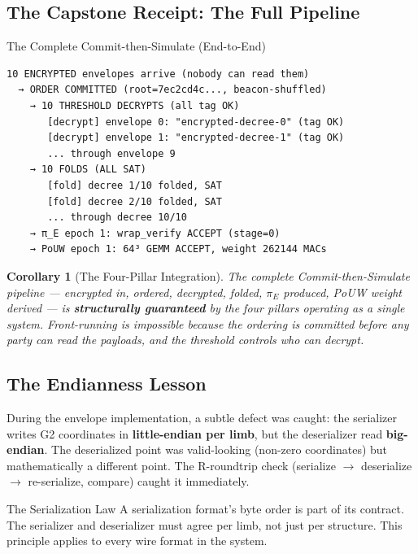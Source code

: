 \documentclass[11pt, a4paper]{article}
\theoremstyle{plain}
\newtheorem{corollary}[theorem]{Corollary}
\theoremstyle{definition}
\theoremstyle{remark}
\begin{document}
\subsection{The Capstone Receipt: The Full Pipeline}

\begin{resultbox}{The Complete Commit-then-Simulate (End-to-End)}
\begin{verbatim}
10 ENCRYPTED envelopes arrive (nobody can read them)
  → ORDER COMMITTED (root=7ec2cd4c..., beacon-shuffled)
    → 10 THRESHOLD DECRYPTS (all tag OK)
       [decrypt] envelope 0: "encrypted-decree-0" (tag OK)
       [decrypt] envelope 1: "encrypted-decree-1" (tag OK)
       ... through envelope 9
    → 10 FOLDS (ALL SAT)
       [fold] decree 1/10 folded, SAT
       [fold] decree 2/10 folded, SAT
       ... through decree 10/10
    → π_E epoch 1: wrap_verify ACCEPT (stage=0)
    → PoUW epoch 1: 64³ GEMM ACCEPT, weight 262144 MACs
\end{verbatim}
\end{resultbox}

\begin{corollary}[The Four-Pillar Integration]
\label{cor:integration}
The complete Commit-then-Simulate pipeline --- encrypted in, ordered,
decrypted, folded, $\pi_E$ produced, PoUW weight derived --- is
\textbf{structurally guaranteed} by the four pillars operating as a
single system. Front-running is impossible because the ordering is
committed before any party can read the payloads, and the threshold
controls who can decrypt.
\end{corollary}

\subsection{The Endianness Lesson}

During the envelope implementation, a subtle defect was caught: the
serializer writes G2 coordinates in \textbf{little-endian per limb},
but the deserializer read \textbf{big-endian}. The deserialized point
was valid-looking (non-zero coordinates) but mathematically a
different point. The R-roundtrip check (serialize $\to$ deserialize
 $\to$ re-serialize, compare) caught it immediately.

\begin{infobox}{The Serialization Law}
A serialization format's byte order is part of its contract. The
serializer and deserializer must agree per limb, not just per
structure. This principle applies to every wire format in the system.
\end{infobox}
\end{document}
